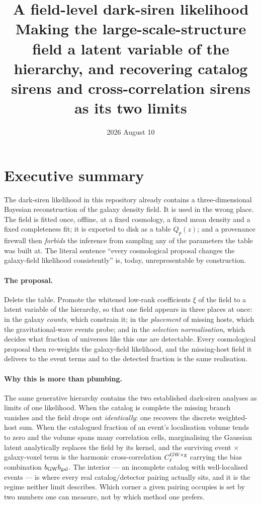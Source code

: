 \documentclass[11pt]{article}
\title{\bf A field-level dark-siren likelihood\\[2pt]
\large Making the large-scale-structure field a latent variable of the
hierarchy, and recovering catalog sirens and cross-correlation sirens as its
two limits}
\author{}
\date{2026 August 10}
\theoremstyle{definition}
\theoremstyle{remark}
\newcommand{\bgw}{b_{\rm GW}}
\newcommand{\bgal}{b_{\rm gal}}
\begin{document}
\maketitle
\vspace{-2.2\baselineskip}

\section*{Executive summary}

The dark-siren likelihood in this repository already contains a three-dimensional
Bayesian reconstruction of the galaxy density field. It is used in the wrong
place. The field is fitted once, offline, at a fixed cosmology, a fixed mean
density and a fixed completeness fit; it is exported to disk as a table
$Q_p(z)$; and a provenance firewall then \emph{forbids} the inference from
sampling any of the parameters the table was built at. The literal sentence
``every cosmological proposal changes the galaxy-field likelihood consistently''
is, today, unrepresentable by construction.

\paragraph{The proposal.} Delete the table. Promote the whitened low-rank
coefficients $\xi$ of the field to a latent variable of the hierarchy, so that
one field appears in three places at once: in the galaxy \emph{counts}, which
constrain it; in the \emph{placement} of missing hosts, which the gravitational-wave
events probe; and in the \emph{selection normalisation}, which decides what
fraction of universes like this one are detectable. Every cosmological proposal
then re-weights the galaxy-field likelihood, and the missing-host field it
delivers to the event terms and to the detected fraction is the same realisation.

\paragraph{Why this is more than plumbing.} The same generative hierarchy
contains the two established dark-siren analyses as limits of one likelihood.
When the catalog is complete the missing branch vanishes and the field drops out
\emph{identically}: one recovers the discrete weighted-host sum. When the
catalogued fraction of an event's localisation volume tends to zero and the
volume spans many correlation cells, marginalising the Gaussian latent
analytically replaces the field by its kernel, and the surviving
event$\,\times\,$galaxy-voxel term is the harmonic cross-correlation
$C_\ell^{\rm GW\times g}$ carrying the bias combination $\bgw\bgal$. The interior
--- an incomplete catalog with well-localised events --- is where every real
catalog/detector pairing actually sits, and it is the regime neither limit
describes. Which corner a given pairing occupies is set by two numbers one can
measure, not by which method one prefers.
\end{document}
